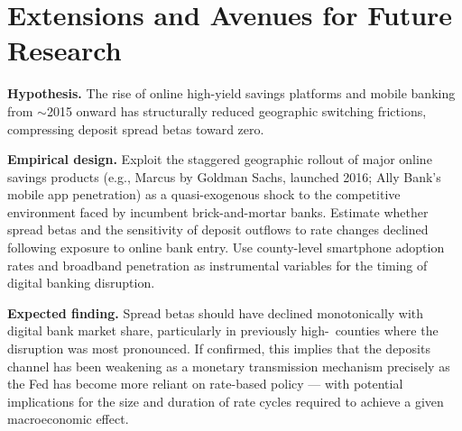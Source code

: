 \documentclass[12pt,a4paper]{article}
\newcommand{\HHI}{\text{HHI}}
\begin{document}
\section{Extensions and Avenues for Future Research}
\label{sec:extensions}

\begin{extbox}
\textbf{Hypothesis.} The rise of online high-yield savings platforms and mobile
banking from $\sim$2015 onward has structurally reduced geographic switching
frictions, compressing deposit spread betas toward zero.

\textbf{Empirical design.} Exploit the staggered geographic rollout of major
online savings products (e.g., Marcus by Goldman Sachs, launched 2016; Ally
Bank's mobile app penetration) as a quasi-exogenous shock to the competitive
environment faced by incumbent brick-and-mortar banks. Estimate whether spread
betas and the sensitivity of deposit outflows to rate changes declined
following exposure to online bank entry. Use county-level smartphone adoption
rates and broadband penetration as instrumental variables for the timing of
digital banking disruption.

\textbf{Expected finding.} Spread betas should have declined monotonically
with digital bank market share, particularly in previously high-\HHI\
counties where the disruption was most pronounced. If confirmed, this implies
that the deposits channel has been weakening as a monetary transmission
mechanism precisely as the Fed has become more reliant on rate-based policy ---
with potential implications for the size and duration of rate cycles required
to achieve a given macroeconomic effect.
\end{extbox}
\end{document}
